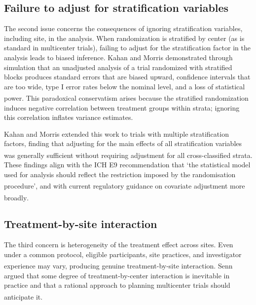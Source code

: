 \documentclass[
  11pt,
]{article}
\begin{document}
\subsection{Failure to adjust for stratification variables}\label{failure-to-adjust-for-stratification-variables}

The second issue concerns the consequences of ignoring
stratification variables, including site, in the analysis.
When randomization is stratified by center (as is standard
in multicenter trials), failing to adjust for the
stratification factor in the analysis leads to biased
inference. Kahan and Morris demonstrated through simulation
that an unadjusted analysis of a trial randomized with
stratified blocks produces standard errors that are biased
upward, confidence intervals that are too wide, type I error
rates below the nominal level, and a loss of statistical
power\textsuperscript{}. This paradoxical
conservatism arises because the stratified randomization
induces negative correlation between treatment groups within
strata; ignoring this correlation inflates variance
estimates.

Kahan and Morris extended this work to trials with multiple
stratification factors, finding that adjusting for the main
effects of all stratification variables was generally
sufficient without requiring adjustment for all
cross-classified strata\textsuperscript{}.
These findings
align with the ICH E9 recommendation that `the
statistical model used for analysis should reflect the
restriction imposed by the randomisation procedure'\textsuperscript{}, and with current regulatory guidance on covariate
adjustment more broadly\textsuperscript{}.

\subsection{Treatment-by-site interaction}\label{treatment-by-site-interaction}

The third concern is heterogeneity of the treatment effect
across sites. Even under a common protocol, eligible
participants, site practices, and investigator experience
may vary, producing genuine treatment-by-site interaction\textsuperscript{}. Senn argued that some degree of
treatment-by-center interaction is inevitable in practice and
that a rational approach to planning multicenter trials
should anticipate it\textsuperscript{}.
\end{document}
